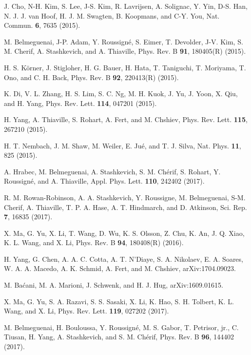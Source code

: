 \documentclass[aps,prl,twocolumn,amsmath,amssymb,superscriptaddress]{revtex4}%
\begin{document}
\begin{thebibliography}{9}
J. Cho, N-H. Kim, S. Lee, J-S. Kim, R. Lavrijsen, A. Solignac, Y. Yin, D-S. Han, N. J. J. van Hoof, H. J. M. Swagten, B. Koopmans, and C-Y. You, Nat. Commun. \textbf{6}, 7635 (2015).

M. Belmeguenai, J-P. Adam, Y. Roussign\'{e}, S. Eimer, T. Devolder, J-V. Kim, S. M. Cherif, A. Stashkevich, and A. Thiaville, Phys. Rev. B \textbf{91}, 180405(R) (2015).

H. S. K\"{o}rner, J. Stigloher, H. G. Bauer, H. Hata, T. Taniguchi, T. Moriyama, T. Ono, and C. H. Back, Phys. Rev. B \textbf{92}, 220413(R) (2015).

K. Di, V. L. Zhang, H. S. Lim, S. C. Ng, M. H. Kuok, J. Yu, J. Yoon, X. Qiu, and H. Yang, Phys. Rev. Lett. \textbf{114}, 047201 (2015).

H. Yang, A. Thiaville, S. Rohart, A. Fert, and M. Chshiev, Phys. Rev. Lett. \textbf{115}, 267210 (2015).

H. T. Nembach, J. M. Shaw, M. Weiler, E. Ju\'{e}, and T. J. Silva, Nat. Phys. \textbf{11}, 825 (2015).	

A. Hrabec,  M. Belmeguenai,  A. Stashkevich,  S. M. Ch\'{e}rif,  S. Rohart,  Y. Roussign\'{e}, and  A. Thiaville, Appl. Phys. Lett. \textbf{110}, 242402 (2017).

R. M. Rowan-Robinson, A. A. Stashkevich, Y. Roussigne, M. Belmeguenai, S-M. Cherif, A. Thiaville, T. P. A. Hase, A. T. Hindmarch, and D. Atkinson, Sci. Rep. \textbf{7}, 16835 (2017).

X. Ma, G. Yu, X. Li, T. Wang, D. Wu, K. S. Olsson, Z. Chu, K. An, J. Q. Xiao, K. L. Wang, and X. Li, Phys. Rev. B \textbf{94}, 180408(R) (2016).

H. Yang, G. Chen, A. A. C. Cotta, A. T. N'Diaye, S. A. Nikolaev, E. A. Soares, W. A. A. Macedo, A. K. Schmid, A. Fert, and M. Chshiev,  arXiv:1704.09023.

M. Ba\'{c}ani, M. A. Marioni, J. Schwenk, and H. J. Hug, arXiv:1609.01615.

X. Ma, G. Yu, S. A. Razavi, S. S. Sasaki, X. Li, K. Hao, S. H. Tolbert, K. L. Wang, and X. Li, Phys. Rev. Lett. \textbf{119}, 027202 (2017).

M. Belmeguenai, H. Bouloussa, Y. Roussigné, M. S. Gabor, T. Petrisor, jr., C. Tiusan, H. Yang, A. Stashkevich, and S. M. Ch\'{e}rif,  Phys. Rev. B \textbf{96}, 144402 (2017).


\end{thebibliography}
\end{document}
